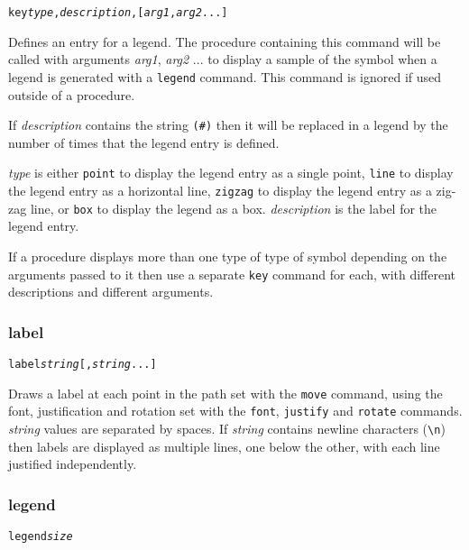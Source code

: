\begin{alltt}
key \textit{type}, \textit{description}, [\textit{arg1}, \textit{arg2} ...]
\end{alltt}

Defines an entry for a legend.  The procedure containing this command will be
called with arguments \textit{arg1}, \textit{arg2} ... to display a sample of
the symbol when a legend is generated with a \texttt{legend} command.  This
command is ignored if used outside of a procedure.

If \textit{description} contains the string \texttt{(\#)} then it will
be replaced in a legend by the number of times that the legend entry
is defined.

\textit{type} is either
\texttt{point} to display the legend entry as a single point,
\texttt{line} to display the legend entry as a horizontal line,
\texttt{zigzag} to display the legend entry as a zig-zag line,
or
\texttt{box} to display the legend as a box.
\textit{description} is the label for the legend entry.

If a procedure displays more than one type of type of symbol depending
on the arguments passed to it then use a separate
\texttt{key} command for each, with different descriptions
and different arguments.

\subsubsection{label}

\begin{alltt}
label \textit{string} [, \textit{string} ...]
\end{alltt}

Draws a label at each point in the path set with the \texttt{move} command,
using the font, justification and rotation set with the \texttt{font},
\texttt{justify} and \texttt{rotate} commands.  \textit{string} values are
separated by spaces.  If \textit{string} contains newline characters
(\texttt{\textbackslash{}n}) then labels are displayed as multiple lines, one
below the other, with each line justified independently.

\subsubsection{legend}

\begin{alltt}
legend \textit{size}
\end{alltt}

